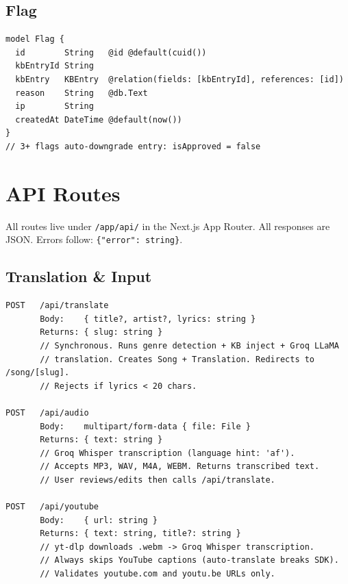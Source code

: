 \documentclass[12pt, a4paper]{article}
\begin{document}
\subsection{Flag}
\begin{tcolorbox}[codebox]
\begin{lstlisting}
model Flag {
  id        String   @id @default(cuid())
  kbEntryId String
  kbEntry   KBEntry  @relation(fields: [kbEntryId], references: [id])
  reason    String   @db.Text
  ip        String
  createdAt DateTime @default(now())
}
// 3+ flags auto-downgrade entry: isApproved = false
\end{lstlisting}
\end{tcolorbox}

\section{API Routes}

All routes live under \texttt{/app/api/} in the Next.js App Router.
All responses are JSON. Errors follow:
\texttt{\{"error": string\}}.

\subsection{Translation \& Input}

\begin{tcolorbox}[codebox]
\begin{lstlisting}
POST   /api/translate
       Body:    { title?, artist?, lyrics: string }
       Returns: { slug: string }
       // Synchronous. Runs genre detection + KB inject + Groq LLaMA
       // translation. Creates Song + Translation. Redirects to /song/[slug].
       // Rejects if lyrics < 20 chars.

POST   /api/audio
       Body:    multipart/form-data { file: File }
       Returns: { text: string }
       // Groq Whisper transcription (language hint: 'af').
       // Accepts MP3, WAV, M4A, WEBM. Returns transcribed text.
       // User reviews/edits then calls /api/translate.

POST   /api/youtube
       Body:    { url: string }
       Returns: { text: string, title?: string }
       // yt-dlp downloads .webm -> Groq Whisper transcription.
       // Always skips YouTube captions (auto-translate breaks SDK).
       // Validates youtube.com and youtu.be URLs only.
\end{lstlisting}
\end{tcolorbox}
\end{document}
